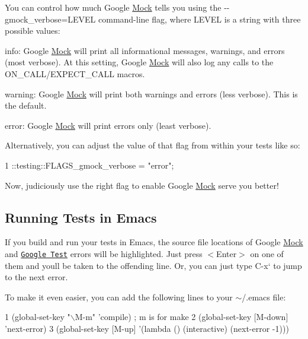 You can control how much Google \hyperlink{classMock}{Mock} tells you using the {\ttfamily -\/-\/gmock\+\_\+verbose=L\+E\+V\+EL} command-\/line flag, where {\ttfamily L\+E\+V\+EL} is a string with three possible values\+:


\begin{DoxyItemize}
\item {\ttfamily info}\+: Google \hyperlink{classMock}{Mock} will print all informational messages, warnings, and errors (most verbose). At this setting, Google \hyperlink{classMock}{Mock} will also log any calls to the {\ttfamily O\+N\+\_\+\+C\+A\+L\+L/\+E\+X\+P\+E\+C\+T\+\_\+\+C\+A\+LL} macros.
\item {\ttfamily warning}\+: Google \hyperlink{classMock}{Mock} will print both warnings and errors (less verbose). This is the default.
\item {\ttfamily error}\+: Google \hyperlink{classMock}{Mock} will print errors only (least verbose).
\end{DoxyItemize}

Alternatively, you can adjust the value of that flag from within your tests like so\+:


\begin{DoxyCode}
1 ::testing::FLAGS\_gmock\_verbose = "error";
\end{DoxyCode}


Now, judiciously use the right flag to enable Google \hyperlink{classMock}{Mock} serve you better!

\subsection*{Running Tests in Emacs}

If you build and run your tests in Emacs, the source file locations of Google \hyperlink{classMock}{Mock} and \href{http://code.google.com/p/googletest/}{\tt Google Test} errors will be highlighted. Just press {\ttfamily $<$Enter$>$} on one of them and you\textquotesingle{}ll be taken to the offending line. Or, you can just type {\ttfamily C-\/x}` to jump to the next error.

To make it even easier, you can add the following lines to your {\ttfamily $\sim$/.emacs} file\+:


\begin{DoxyCode}
1 (global-set-key "\(\backslash\)M-m"   'compile)  ; m is for make
2 (global-set-key [M-down] 'next-error)
3 (global-set-key [M-up]   '(lambda () (interactive) (next-error -1)))
\end{DoxyCode}


